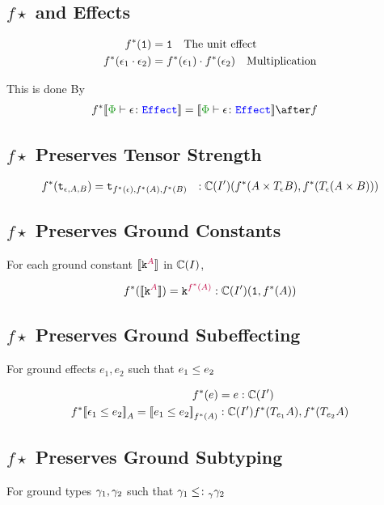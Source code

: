 \subsection{$f\star$ and Effects}
\begin{align*}
    f^*(\texttt{1}) &= \texttt{1} \quad\text{The unit effect}\\
    f^*(\epsilon_1\cdot\epsilon_2) &= f^*(\epsilon_1)\cdot f^*(\epsilon_2)\quad\text{Multiplication}\\
\end{align*}

This is done By
\begin{align*}
    f\star\deno{\typerelation{\P}{\e}{\effect}} & = \deno{\typerelation{\P}{\e}{\effect}}\after f
\end{align*}

\subsection{$f\star$ Preserves Tensor Strength}
\begin{align*}
    f^*(\texttt{t}_{\epsilon, A, B}) &= \texttt{t}_{f^*(\epsilon), f^*(A), f^*(B)} &: \mathbb{C}(I')(f^*(A\times T_{\epsilon}{B}), f^*(T_{\epsilon}{(A\times B)}))
\end{align*}
\subsection{$f\star$ Preserves Ground Constants}
For each ground constant ${\bf [\![}\texttt{k}^{\color{purple} A}{\bf ]\!]}$ in $\mathbb{C}(I)$,

\begin{align*}
    f^*({\bf [\![}\texttt{k}^{\color{purple} A}{\bf ]\!]}) = \texttt{k}^{\color{purple} f^*(A)} : \mathbb{C}(I')(\texttt{1}, f^*(A))
\end{align*}
\subsection{$f\star$ Preserves Ground Subeffecting}
For ground effects $e_1, e_2$ such that $e_1\leq e_2$



\begin{align*}
    f^*(e) & = e: \mathbb{C}(I')\\
    f^*{\bf [\![}\epsilon_1\leq e_2{\bf ]\!]}_A = {\bf [\![}e_1 \leq e_2{\bf ]\!]}_{f^*(A)} &:\mathbb{C}(I'){f^*(T_{e_1}{A}), f^*(T_{e_2}{A})} \\
\end{align*}
\subsection{$f\star$ Preserves Ground Subtyping}
For ground types $\gamma_1, \gamma_2$ such that $\gamma_1\leq\colon_\gamma\gamma_2$

